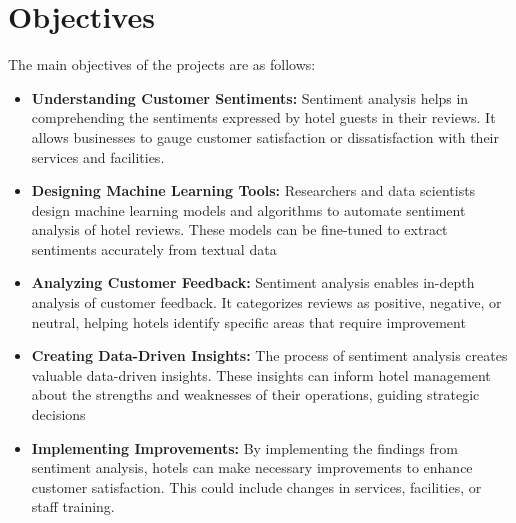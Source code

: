 \documentclass[a4paper, 12pt]{report}
\begin{document}
\section{Objectives}
\par The main objectives of the projects are as follows:
\begin{itemize}
	\item  \textbf{Understanding Customer Sentiments:} Sentiment analysis helps in comprehending the sentiments expressed by hotel guests in their reviews. It allows businesses to gauge customer satisfaction or dissatisfaction with their services and facilities. 
	\item  \textbf{Designing Machine Learning Tools:} Researchers and data scientists design machine learning models and algorithms to automate sentiment analysis of hotel reviews. These models can be fine-tuned to extract sentiments accurately from textual data 
	\item  \textbf{Analyzing Customer Feedback:} Sentiment analysis enables in-depth analysis of customer feedback. It categorizes reviews as positive, negative, or neutral, helping hotels identify specific areas that require improvement 
	\item  \textbf{Creating Data-Driven Insights:} The process of sentiment analysis creates valuable data-driven insights. These insights can inform hotel management about the strengths and weaknesses of their operations, guiding strategic decisions 
	\item  \textbf{Implementing Improvements:} By implementing the findings from sentiment analysis, hotels can make necessary improvements to enhance customer satisfaction. This could include changes in services, facilities, or staff training. 
\end{itemize}
\end{document}
